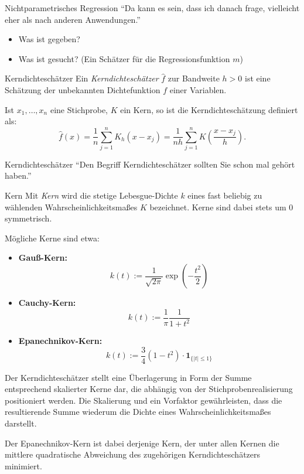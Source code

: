 \begin{info}{Nichtparametrisches Regression}
    \enquote{Da kann es sein, dass ich danach frage, vielleicht eher als nach anderen Anwendungen.}
    \begin{itemize}
        \item Was ist gegeben?
        \item Was ist gesucht? (Ein Schätzer für die Regressionsfunktion $m$)
    \end{itemize}
\end{info}

\begin{defi}{Kerndichteschätzer}
    Ein \emph{Kerndichteschätzer} $\hat{f}$ zur Bandweite $h>0$ ist eine Schätzung der unbekannten Dichtefunktion $f$ einer Variablen.

    Ist $x_{1},\ldots ,x_{n}$ eine Stichprobe, $K$ ein Kern, so ist die Kerndichteschätzung definiert als:
    \[
        \hat{f}(x) = \frac{1}{n} \sum _{j=1}^{n}K_{h}(x-x_{j})={\frac{1}{nh}}\sum _{j=1}^{n}K\left({\frac{x-x_{j}}{h}}\right).
    \]
\end{defi}

\begin{info}{Kerndichteschätzer}
    \enquote{Den Begriff Kerndichteschätzer sollten Sie schon mal gehört haben.}
\end{info}

\begin{defi}{Kern}
    Mit \emph{Kern} wird die stetige Lebesgue-Dichte $k$ eines fast beliebig zu wählenden Wahrscheinlichkeitsmaßes $K$ bezeichnet.
    Kerne sind dabei stets um 0 symmetrisch.

    Mögliche Kerne sind etwa:
    \begin{itemize}
        \item \textbf{Gauß-Kern:}
              \[
                  k(t) := \frac{1}{\sqrt{2\pi}} \exp\left(-\frac{t^2}{2}\right)
              \]
        \item \textbf{Cauchy-Kern:}
              \[
                  k(t) := \frac{1}{\pi} \frac{1}{1+t^2}
              \]
        \item \textbf{Epanechnikov-Kern:}
              \[
                  k(t) := \frac{3}{4} (1-t^2) \cdot \mathbf{1}_{\{|t| \leq 1\}}
              \]
    \end{itemize}

    Der Kerndichteschätzer stellt eine Überlagerung in Form der Summe entsprechend skalierter Kerne dar, die abhängig von der Stichprobenrealisierung positioniert werden.
    Die Skalierung und ein Vorfaktor gewährleisten, dass die resultierende Summe wiederum die Dichte eines Wahrscheinlichkeitsmaßes darstellt.

    Der Epanechnikov-Kern ist dabei derjenige Kern, der unter allen Kernen die mittlere quadratische Abweichung des zugehörigen Kerndichteschätzers minimiert.
\end{defi}

